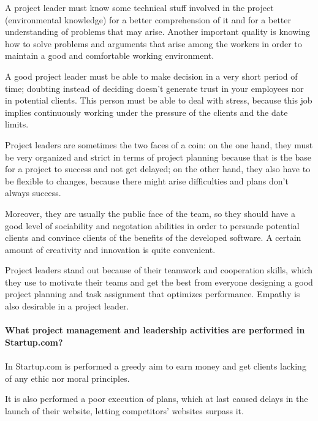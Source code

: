 \documentclass{article}
\begin{document}
A project leader must know some technical stuff involved in the project (environmental knowledge) for a better comprehension of it and for a better understanding of problems that may arise. Another important quality is knowing how to solve problems and arguments that arise among the workers in order to maintain a good and comfortable working environment.

A good project leader must be able to make decision in a very short period of time; doubting instead of deciding doesn't generate trust in your employees nor in potential clients. This person must be able to deal with stress, because this job implies continuously working under the pressure of the clients and the date limits. 

Project leaders are sometimes the two faces of a coin: on the one hand, they must be very organized and strict in terms of project planning because that is the base for a project to success and not get delayed; on the other hand, they also have to be flexible to changes, because there might arise difficulties and plans don't always success.

Moreover, they are usually the public face of the team, so they should have a good level of sociability and negotation abilities in order to persuade potential clients and convince clients of the benefits of the developed software. A certain amount of creativity and innovation is quite convenient.

Project leaders stand out because of their teamwork and cooperation skills, which they use to motivate their teams and get the best from everyone designing a good project planning and task assignment that optimizes performance. Empathy is also desirable in a project leader.


\paragraph{What project management and leadership activities are performed in Startup.com?}
\paragraph{}

In Startup.com is performed a greedy aim to earn money and get clients lacking of any ethic nor moral principles. 

It is also performed a poor execution of plans, which at last caused delays in the launch of their website, letting competitors' websites surpass it. 
\end{document}
